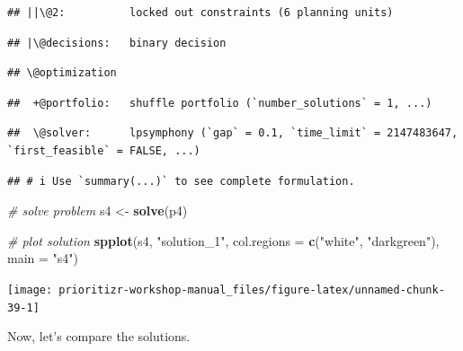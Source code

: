 \documentclass[12pt,]{book}
\newenvironment{Shaded}{\begin{snugshade}}{\end{snugshade}}
\newcommand{\CommentTok}[1]{\textcolor[rgb]{0.56,0.35,0.01}{\textit{#1}}}
\newcommand{\DataTypeTok}[1]{\textcolor[rgb]{0.13,0.29,0.53}{#1}}
\newcommand{\KeywordTok}[1]{\textcolor[rgb]{0.13,0.29,0.53}{\textbf{#1}}}
\newcommand{\NormalTok}[1]{#1}
\newcommand{\StringTok}[1]{\textcolor[rgb]{0.31,0.60,0.02}{#1}}
\begin{document}
\begin{verbatim}
## ||\@2:          locked out constraints (6 planning units)
\end{verbatim}

\begin{verbatim}
## |\@decisions:   binary decision
\end{verbatim}

\begin{verbatim}
## \@optimization
\end{verbatim}

\begin{verbatim}
##  +@portfolio:   shuffle portfolio (`number_solutions` = 1, ...)
\end{verbatim}

\begin{verbatim}
##  \@solver:      lpsymphony (`gap` = 0.1, `time_limit` = 2147483647, `first_feasible` = FALSE, ...)
\end{verbatim}

\begin{verbatim}
## # i Use `summary(...)` to see complete formulation.
\end{verbatim}

\begin{Shaded}
\begin{Highlighting}[]
\CommentTok{# solve problem}
\NormalTok{s4 <-}\StringTok{ }\KeywordTok{solve}\NormalTok{(p4)}

\CommentTok{# plot solution}
\KeywordTok{spplot}\NormalTok{(s4, }\StringTok{"solution_1"}\NormalTok{, }\DataTypeTok{col.regions =} \KeywordTok{c}\NormalTok{(}\StringTok{"white"}\NormalTok{, }\StringTok{"darkgreen"}\NormalTok{), }\DataTypeTok{main =} \StringTok{"s4"}\NormalTok{)}
\end{Highlighting}
\end{Shaded}

\begin{center}\texttt{[image: prioritizr-workshop-manual\_files/figure-latex/unnamed-chunk-39-1]} \end{center}

\clearpage

Now, let's compare the solutions.
\end{document}
